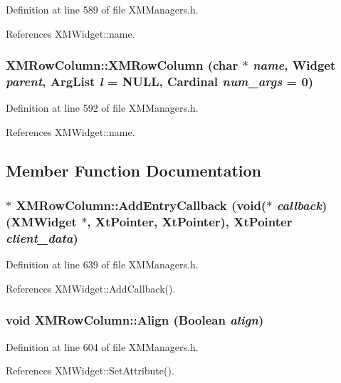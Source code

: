 Definition at line 589 of file XMManagers.h.

References XMWidget::name.
\subsubsection{\setlength{\rightskip}{0pt plus 5cm}XMRow\-Column::XMRow\-Column (char $\ast$ {\em name}, Widget {\em parent}, Arg\-List {\em l} = NULL, Cardinal {\em num\_\-args} = 0)\hspace{0.3cm}{\tt  [inline]}}\label{classXMRowColumn_a4}




Definition at line 592 of file XMManagers.h.

References XMWidget::name.

\subsection{Member Function Documentation}
\subsubsection{$\ast$ XMRow\-Column::Add\-Entry\-Callback (void($\ast$ {\em callback})({\bf XMWidget} $\ast$, Xt\-Pointer, Xt\-Pointer), Xt\-Pointer {\em client\_\-data})\hspace{0.3cm}{\tt  [inline]}}\label{classXMRowColumn_a18}




Definition at line 639 of file XMManagers.h.

References XMWidget::Add\-Callback().
\subsubsection{\setlength{\rightskip}{0pt plus 5cm}void XMRow\-Column::Align (Boolean {\em align})\hspace{0.3cm}{\tt  [inline]}}\label{classXMRowColumn_a7}




Definition at line 604 of file XMManagers.h.

References XMWidget::Set\-Attribute().
